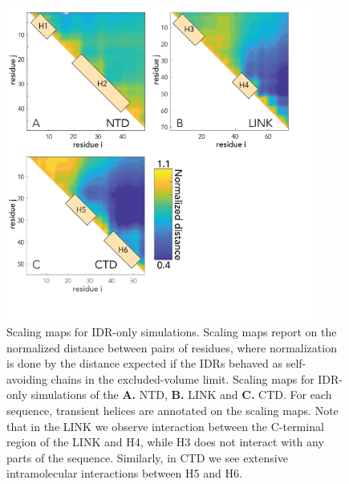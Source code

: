 \documentclass[../main.tex]{subfiles}
\begin{document}
        \begin{figure}[!htb] %
            \centering
            \includegraphics[width=4in]{appendix-e-fig15.png}
            \caption[Scaling maps for IDR-only simulations.]
                {Scaling maps for IDR-only simulations. Scaling maps report on the normalized distance between pairs of residues, where normalization is done by the distance expected if the IDRs behaved as self-avoiding chains in the excluded-volume limit. Scaling maps for IDR-only simulations of the \textbf{A.} NTD, \textbf{B.} LINK and \textbf{C.} CTD. For each sequence, transient helices are annotated on the scaling maps. Note that in the LINK we observe interaction between the C-terminal region of the LINK and H4, while H3 does not interact with any parts of the sequence. Similarly, in CTD we see extensive intramolecular interactions between H5 and H6.}
            \label{fig:appendix-e-fig15}
        \end{figure}
\end{document}
